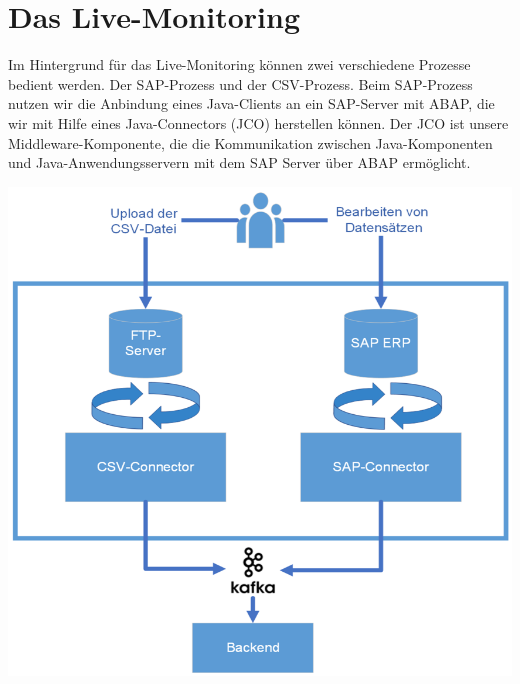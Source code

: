 \section*{Das Live-Monitoring}
Im Hintergrund für das Live-Monitoring können zwei verschiedene Prozesse bedient werden. Der SAP-Prozess und der CSV-Prozess.
\newline
\newline
Beim SAP-Prozess nutzen wir die Anbindung eines Java-Clients an ein SAP-Server mit ABAP, die wir mit Hilfe eines Java-Connectors (JCO) herstellen können. Der JCO ist unsere Middleware-Komponente, die die Kommunikation zwischen Java-Komponenten und Java-Anwendungsservern mit dem SAP Server über ABAP ermöglicht.

\includegraphics[width=\linewidth]{src/abbildungen/architektur_connector.png}
\newline
{}
\newline

